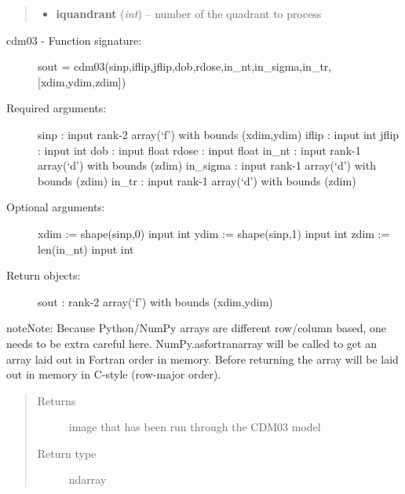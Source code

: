 \documentclass[a4paper,12pt,english]{sphinxmanual}
\begin{document}
\begin{fulllineitems}
\begin{fulllineitems}
\begin{quote}
\begin{description}
\begin{itemize}
\item {} 
\textbf{iquandrant} (\emph{int}) -- number of the quadrant to process

\end{itemize}

\end{description}\end{quote}
\begin{description}
\item[{cdm03 - Function signature:}] \leavevmode
sout = cdm03(sinp,iflip,jflip,dob,rdose,in\_nt,in\_sigma,in\_tr,{[}xdim,ydim,zdim{]})

\item[{Required arguments:}] \leavevmode
sinp : input rank-2 array(`f') with bounds (xdim,ydim)
iflip : input int
jflip : input int
dob : input float
rdose : input float
in\_nt : input rank-1 array(`d') with bounds (zdim)
in\_sigma : input rank-1 array(`d') with bounds (zdim)
in\_tr : input rank-1 array(`d') with bounds (zdim)

\item[{Optional arguments:}] \leavevmode
xdim := shape(sinp,0) input int
ydim := shape(sinp,1) input int
zdim := len(in\_nt) input int

\item[{Return objects:}] \leavevmode
sout : rank-2 array(`f') with bounds (xdim,ydim)

\end{description}

\begin{notice}{note}{Note:}
Because Python/NumPy arrays are different row/column based, one needs
to be extra careful here. NumPy.asfortranarray will be called to get
an array laid out in Fortran order in memory. Before returning the
array will be laid out in memory in C-style (row-major order).
\end{notice}
\begin{quote}\begin{description}
\item[{Returns}] \leavevmode
image that has been run through the CDM03 model

\item[{Return type}] \leavevmode
ndarray

\end{description}\end{quote}

\end{fulllineitems}



\end{fulllineitems}
\end{document}
